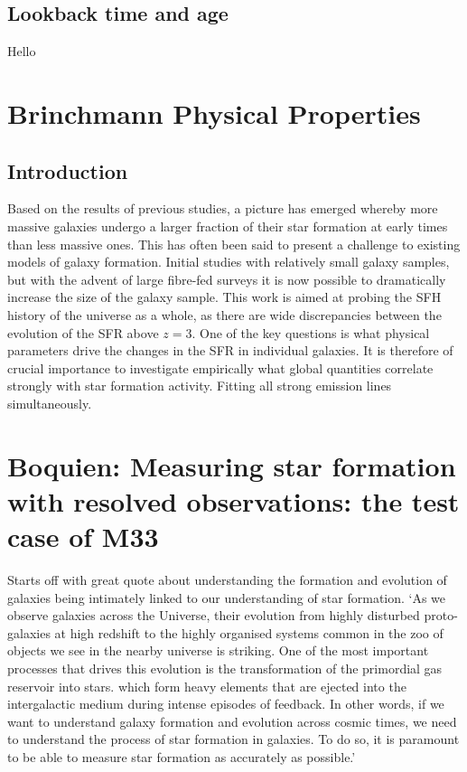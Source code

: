 \documentclass{literature}
\begin{document}
\subsection{Lookback time and age}\label{subs:lookback time}
Hello








\section{Brinchmann Physical Properties}\label{sec:Brinchmann_properties}
\subsection{Introduction}
Based on the results of previous studies, a picture has emerged whereby more massive galaxies undergo a larger fraction of their star formation at early times than less massive ones. This has often been said to present a challenge to existing models of galaxy formation. Initial studies with relatively small galaxy samples, but with the advent of large fibre-fed surveys it is now possible to dramatically increase the size of the galaxy sample. This work is aimed at probing the SFH history of the universe as a whole, as there are wide discrepancies between the evolution of the SFR above $z = 3$. One of the key questions is what physical parameters drive the changes in the SFR in individual galaxies. It is therefore of crucial importance to investigate empirically what global quantities correlate strongly with star formation activity. Fitting all strong emission lines simultaneously. 


\section{Boquien: Measuring star formation with resolved observations: the test case of M33}
Starts off with great quote about understanding the formation and evolution of galaxies being intimately linked to our understanding of star formation. `As we observe galaxies across the Universe, their evolution from highly disturbed proto-galaxies at high redshift to the highly organised systems common in the zoo of objects we see in the nearby universe is striking. One of the most important processes that drives this evolution is the transformation of the primordial gas reservoir into stars. which form heavy elements that are ejected into the intergalactic medium during intense episodes of feedback. In other words, if we want to understand galaxy formation and evolution across cosmic times, we need to understand the process of star formation in galaxies. To do so, it is paramount to be able to measure star formation as accurately as possible.' \\ 
\end{document}

